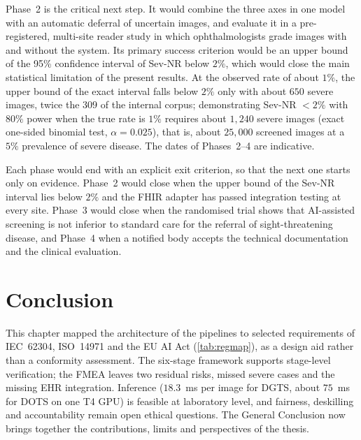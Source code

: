 Phase~2 is the critical next step. It would combine the three axes in one model with an
automatic deferral of uncertain images, and evaluate it in a pre-registered, multi-site
reader study in which ophthalmologists grade images with and without the system. Its
primary success criterion would be an upper bound of the 95\% confidence interval of
Sev-NR below $2\%$, which would close the main statistical limitation of
the present results. At the observed rate of about $1\%$, the upper bound of the exact
interval falls below $2\%$ only with about $650$ severe images, twice the $309$ of the
internal corpus; demonstrating Sev-NR $<2\%$ with $80\%$ power when the true rate is $1\%$
requires about $1{,}240$ severe images (exact one-sided binomial test, $\alpha=0.025$), that
is, about $25{,}000$ screened images at a $5\%$ prevalence of severe disease.
The dates of Phases~2--4 are indicative.

Each phase would end with an explicit exit criterion, so that the next one starts only on
evidence. Phase~2 would close when the upper bound of the Sev-NR interval lies below $2\%$ and the
FHIR adapter has passed integration testing at every site. Phase~3 would close when the
randomised trial shows that AI-assisted screening is not inferior to standard care for the
referral of sight-threatening disease, and Phase~4 when a notified body accepts the
technical documentation and the clinical evaluation.


\section*{Conclusion}

This chapter mapped the architecture of the pipelines to selected requirements of
IEC~62304, ISO~14971 and the EU AI Act (\cref{tab:regmap}), as a design aid rather than a
conformity assessment. The six-stage framework supports stage-level verification; the
FMEA leaves two residual risks, missed severe cases and the missing EHR integration.
Inference ($18.3$~ms per image for DGTS, about $75$~ms for DOTS on one T4 GPU) is feasible
at laboratory level, and fairness, deskilling and accountability remain open ethical
questions. The General Conclusion now brings together the contributions, limits and
perspectives of the thesis.
